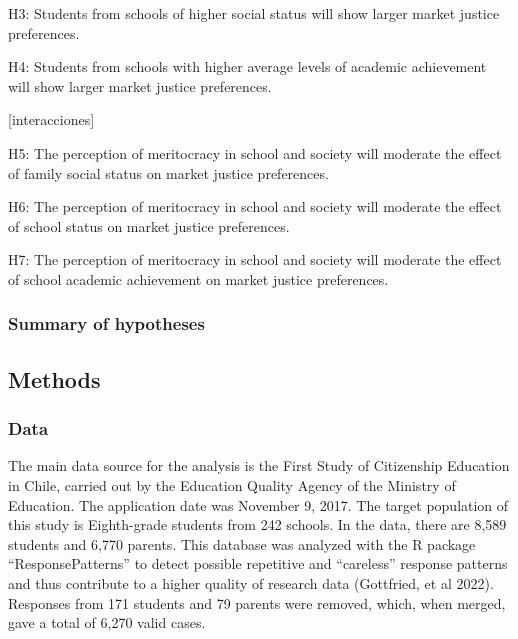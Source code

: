 \documentclass[
  letterpaper,
  DIV=11,
  numbers=noendperiod]{scrartcl}
\begin{document}
H3: Students from schools of higher social status will show larger
market justice preferences.

H4: Students from schools with higher average levels of academic
achievement will show larger market justice preferences.

{[}interacciones{]}

H5: The perception of meritocracy in school and society will moderate
the effect of family social status on market justice preferences.

H6: The perception of meritocracy in school and society will moderate
the effect of school status on market justice preferences.

H7: The perception of meritocracy in school and society will moderate
the effect of school academic achievement on market justice preferences.

\hypertarget{summary-of-hypotheses}{%
\subsubsection{Summary of hypotheses}\label{summary-of-hypotheses}}

\hypertarget{section}{%
\subsection{}\label{section}}

\hypertarget{methods}{%
\subsection{Methods}\label{methods}}

\hypertarget{data}{%
\subsubsection{Data}\label{data}}

The main data source for the analysis is the First Study of Citizenship
Education in Chile, carried out by the Education Quality Agency of the
Ministry of Education. The application date was November 9, 2017. The
target population of this study is Eighth-grade students from 242
schools. In the data, there are 8,589 students and 6,770 parents. This
database was analyzed with the R package ``ResponsePatterns'' to detect
possible repetitive and ``careless'' response patterns and thus
contribute to a higher quality of research data (Gottfried, et al 2022).
Responses from 171 students and 79 parents were removed, which, when
merged, gave a total of 6,270 valid cases.
\end{document}
